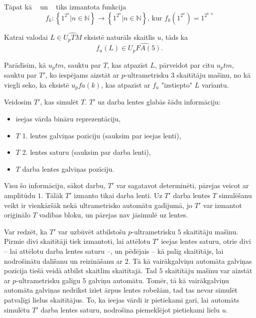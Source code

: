 \documentclass{ludis}
\begin{document}
Tāpat kā ~\citep{Macarie1995} un ~\citep{Monien1980} tiks izmantota funkcija
\[
	f_k : \left\{ 1^{2^n} | n \in \mathbb{N} \right\} \rightarrow \left\{ 1^{2^n} | n \in \mathbb{N} \right\} \textrm{, kur } f_k( 1^{2^n}) = 1^{2^{k \cdot n}}
\]

\begin{lemma} \label{skaititaji}
Katrai valodai $L \in \widehat{U_pTM}$ eksistē naturāls skaitlis $u$, tāds ka
\[
	f_u(L) \in \widehat{U_pFA(5)}.
\]
\end{lemma}
\begin{pieradijums}
Parādīsim, kā $u_ptm$, sauktu par $T$, kas atpazīst $L$, pārveidot par citu $u_ptm$, sauktu par $T'$, ko iespējams aizstāt ar $p$-ultrametrisku $3$ skaitītāju mašīnu, no kā viegli seko, ka eksistē $u_pfa(k)$, kas atpazīst ar $f_u$ "izstiepto" $L$ variantu.

Veidosim $T'$, kas simulēt $T$. $T'$ uz darba lentes glabās šādu informāciju:
\begin{itemize}
	\item ieejas vārda bināru reprezentāciju,
	\item $T$ 1. lentes galviņas pozīciju (sauksim par ieejas lenti),
	\item $T$ 2. lentes saturu (sauksim par darba lenti), %
	\item $T$ darba lentes galviņas pozīciju.
\end{itemize} %
Visu šo informāciju, sākot darbu, $T'$ var sagatavot determinēti, pārejas veicot ar amplitūdu $1$. Tālāk $T'$ izmanto tikai darba lenti. Uz $T'$ darba lentes $T$ simulēšanu veikt ir vienkāršāk nekā ultrametrisko automātu gadījumā, jo $T'$ var izmantot oriģinālo $T$ vadības bloku, un pārejas nav jāsimulē uz lentes.

Var redzēt, ka $T'$ var uzbūvēt atbilstošu $p$-ultrametrisku $5$ skaitītāju mašīnu. Pirmie divi skaitītāji tiek izmantoti, lai attēlotu $T'$ ieejas lentes saturu, otrie divi -- lai attēlotu darba lentes saturu --, un pēdējais -- kā palīg skaitītājs, lai nodrošinātu dalīšanu un reizināšanu ar $2$. Tā kā vairākgalviņu automāta galviņas pozīcija tiešā veidā atbilst skaitlim skaitītajā. Tad $5$ skaitītāju mašīnu var aizstāt ar $p$-ultrametrisku galīgu $5$ galviņu automātu. Tomēr, tā kā vairākgalviņu automāta galviņas nedrīkst iziet ārpus lentes robežām, tad tas nevar simulēt patvaļīgi lielus skaitītājus. To, ka ieejas vārdi ir pietiekami gari, lai automāts simulētu $T'$ darba lentes saturu, nodrošina piemeklējot pietiekami lielu $u$.
\end{pieradijums}
\end{document}
